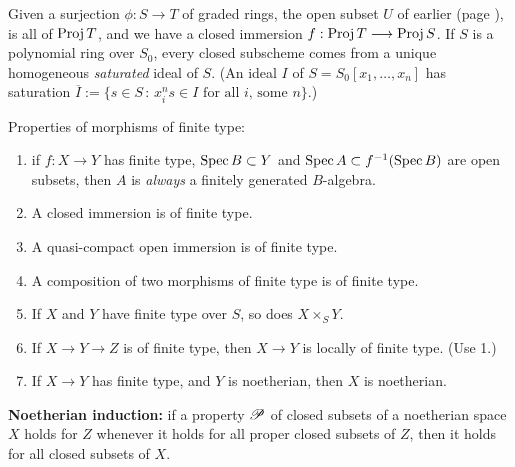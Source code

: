 \documentclass[11pt]{article}
\newcommand{\Index}[1]{\index{#1}#1}
\begin{document}
\begin{itemise}
\item Given a surjection $\phi:S\to T$ of graded rings, the open subset $U$ of
earlier (page \pageref{mapsofprojs}), is all of $\operatorname{Proj} T$, and we have a closed
immersion $f:\operatorname{Proj} T\longrightarrow\operatorname{Proj} S$. If $S$ is a polynomial ring over $S_0$, every
closed subscheme comes from a unique
homogeneous \emph{saturated} ideal of $S$.
{\small(An ideal $I$ of $S=S_0[x_1,\ldots,x_n]$ has saturation $\overline
I:=\{s\in S\,:\,x^n_is\in I\text{\ for all $i$, some $n$}\}$.)}
\item Properties of morphisms of \Index{finite type}:
\begin{enumerate}\squishlist
\item if $f:X\to Y$ has finite type, $\operatorname{Spec} B\subset Y$ and $\operatorname{Spec} A\subset
f^{-1}(\operatorname{Spec} B)$ are open subsets, then $A$ is \emph{always} a finitely
generated $B$-algebra.
\item A closed immersion is of finite type. 
\item A quasi-compact open immersion is of finite type. 
\item A composition of two morphisms of finite type is of finite type. 
\item If $X$ and $Y$ have finite type over $S$, so does $X\times_SY$. 
\item If $X\to Y\to Z$ is of finite type, then $X\to Y$ is locally of finite
type. {\small(Use 1.)}
\item If $X\to Y$ has finite type, and $Y$ is \Index{noetherian}, then $X$ is
noetherian.
\end{enumerate}
\item \textbf{Noetherian induction:} if a property
$\mathscr{P}$ of closed subsets of a noetherian space $X$ holds for $Z$ whenever it
holds for all proper closed subsets of $Z$, then it holds for all closed subsets
of $X$.
\end{itemise}
\end{document}
